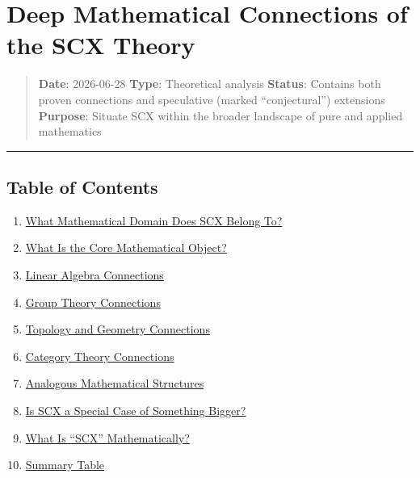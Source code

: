 \documentclass[
  12pt,
]{ctexart}
\author{SCX}
\date{2026}
\providecommand{\tightlist}{%
  \setlength{\itemsep}{0pt}\setlength{\parskip}{0pt}}
\begin{document}
\section{Deep Mathematical Connections of the SCX
Theory}\label{deep-mathematical-connections-of-the-scx-theory}

\begin{quote}
\textbf{Date}: 2026-06-28 \textbar{} \textbf{Type}: Theoretical analysis
\textbf{Status}: Contains both proven connections and speculative
(marked ``conjectural'') extensions \textbf{Purpose}: Situate SCX within
the broader landscape of pure and applied mathematics
\end{quote}

\begin{center}\rule{0.5\linewidth}{0.5pt}\end{center}

\subsection{Table of Contents}\label{table-of-contents}

\begin{enumerate}
\def\labelenumi{\arabic{enumi}.}
\tightlist
\item
  \hyperref[1-what-mathematical-domain-does-scx-belong-to]{What
  Mathematical Domain Does SCX Belong To?}
\item
  \hyperref[2-what-is-the-core-mathematical-object]{What Is the Core
  Mathematical Object?}
\item
  \hyperref[3-linear-algebra-connections]{Linear Algebra Connections}
\item
  \hyperref[4-group-theory-connections]{Group Theory Connections}
\item
  \hyperref[5-topology-and-geometry-connections]{Topology and Geometry
  Connections}
\item
  \hyperref[6-category-theory-connections]{Category Theory Connections}
\item
  \hyperref[7-analogous-mathematical-structures]{Analogous Mathematical
  Structures}
\item
  \hyperref[8-is-scx-a-special-case-of-something-bigger]{Is SCX a
  Special Case of Something Bigger?}
\item
  \hyperref[9-what-is-scx-mathematically]{What Is ``SCX''
  Mathematically?}
\item
  \hyperref[10-summary-table]{Summary Table}
\end{enumerate}
\end{document}
